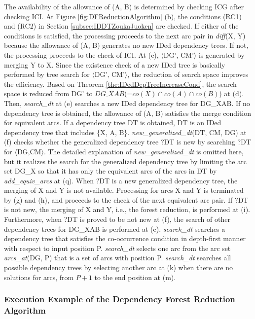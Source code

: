 \documentclass[english]{jnlp_1.4_rep}
\theoremstyle{break}
\theoremstyle{plain}
\theoremstyle{plain}
\begin{document}
The availability of the allowance of (A, B) is determined by checking
ICG after checking ICI. At Figure \ref{fig:DFReductionAlgorithm} (b), the
conditions (RC1) and (RC2) in Section \ref{subsec:IDDTZoukaJuoken} are
checked. If either of the conditions is satisfied, the processing
proceeds to the next arc pair in \textit{diff}(X, Y) because the allowance
of (A, B) generates no new IDed dependency trees. If not, the
processing proceeds to the check of ICI. At (c), $\langle\text{DG', CM'}\rangle$ is
generated by merging Y to X. Since the existence check of a new IDed
tree is basically performed by tree search for $\langle\text{DG', CM'}\rangle$, the
reduction of search space improves the efficiency. Based on Theorem
\ref{the:IDedDepTreeIncreaseCond}, the search space is reduced from
DG' to $DG\_XAB$(=$co(X){\cap}co(A){\cap}co(B)$) at (d). Then,
\textit{search\_dt} at (e) searches a new IDed dependency tree for
DG\_XAB. If no dependency tree is obtained, the allowance of (A, B)
satisfies the merge condition for equivalent arcs.  If a dependency
tree DT is obtained, DT is an IDed dependency tree that includes \{X,
A, B\}. \textit{new\_generalized\_dt}(DT, CM, DG) at (f) checks whether the
generalized dependency tree ?DT is new by searching ?DT for $\langle\text{DG,CM}\rangle$. 
The detailed explanation of \textit{new\_generalized\_dt} is omitted
here, but it realizes the search for the generalized dependency tree
by limiting the arc set DG\_X so that it has only the equivalent arcs
of the arcs in DT by \textit{add\_equiv\_arcs} at (q). When ?DT is a new
generalized dependency tree, the merging of X and Y is not
available. Processing for arcs X and Y is terminated by (g) and (h),
and proceeds to the check of the next equivalent arc pair. If ?DT is
not new, the merging of X and Y, i.e., the forest reduction, is
performed at (i). Furthermore, when ?DT is proved to be not new at
(f), the search of other dependency trees for DG\_XAB is performed at
(e). \textit{search\_dt} searches a dependency tree that satisfies the
co-occurrence condition in depth-first manner with respect to input
position P. \textit{search\_dt} selects one arc from the arc set
\textit{arcs\_at}(DG, P) that is a set of arcs with position
P. \textit{search\_dt} searches all possible dependency trees by selecting
another arc at (k) when there are no solutions for arcs, from $P+1$ to
the end position at (m).


\subsubsection{Execution Example of the Dependency Forest Reduction Algorithm}
\end{document}
